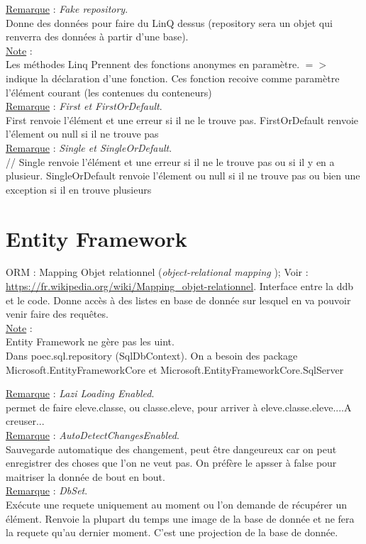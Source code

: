 \documentclass[a4paper,12pt,twoside]{article}
\newcommand{\rem}[2]{\noindent\underline{Remarque} : \textit{#1}.\\ \indent #2}
\newcommand{\note}[1]{\noindent\underline{Note} : \\ \indent #1}
\begin{document}
\rem{Fake repository}{Donne des données pour faire du LinQ dessus (repository sera un objet qui renverra des données à partir d'une base).}\\

\note{Les méthodes Linq Prennent des fonctions anonymes en paramètre. $=>$ indique la déclaration d'une fonction. Ces fonction recoive comme paramètre l'élément courant (les contenues du conteneurs)}\\

\rem{First et FirstOrDefault}{First renvoie l'élément et une erreur si il ne le trouve pas. FirstOrDefault renvoie l'élement ou null si il ne trouve pas}\\

\rem{Single et SingleOrDefault}{// Single renvoie l'élément et une erreur si il ne le trouve pas ou si il y en a plusieur. SingleOrDefault renvoie l'élement ou null si il ne trouve pas ou bien une exception si il en trouve plusieurs}\\

\section{Entity Framework}

ORM  : Mapping Objet relationnel (\textit{object-relational mapping }); Voir : \url{https://fr.wikipedia.org/wiki/Mapping_objet-relationnel}. Interface entre la ddb et le code.
Donne accès à des listes en base de donnée sur lesquel en va pouvoir venir faire des requêtes.\\

\note{Entity Framework ne gère pas les uint.}\\

Dans poec.sql.repository (SqlDbContext). On a besoin des package Microsoft.EntityFrameworkCore et Microsoft.EntityFrameworkCore.SqlServer

\rem{Lazi Loading Enabled}{permet de faire eleve.classe, ou classe.eleve, pour arriver à eleve.classe.eleve....A creuser...}\\

\rem{AutoDetectChangesEnabled}{Sauvegarde automatique des changement, peut être dangeureux car on peut enregistrer des choses que l'on ne veut pas. On préfère le apsser à false pour maitriser la donnée de bout en bout.}\\

\rem{DbSet}{Exécute une requete uniquement au moment ou l'on demande de récupérer un élément. Renvoie la plupart du temps une image de la base de donnée et ne fera la requete qu'au dernier moment. C'est une projection de la base de donnée.}\\
\end{document}
